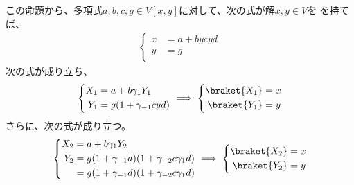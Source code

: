 {	この命題から、多項式$a,b,c,g\in V[x,y]$に対して、次の式が解$x,y\in V$を
	を持てば、
	\begin{equation*}\begin{split}
		\left\{\begin{split}
			x &= a + bycyd \\
			y &= g \\
		\end{split}\right.
	\end{split}\end{equation*}
	次の式が成り立ち、
	\begin{equation*}\begin{split}
		\left\{\begin{split}
			X_1 &= a + b\gamma_1Y_1 \\
			Y_1 &= g(1 + \gamma_{-1}cyd) \\
		\end{split}\right. \implies \left\{\begin{split}
			\braket{X_1} &= x \\
			\braket{Y_1} &= y \\
		\end{split}\right.
	\end{split}\end{equation*}
	さらに、次の式が成り立つ。
	\begin{equation*}\begin{split}
		\left\{\begin{split}
			X_2 &= a + b\gamma_1Y_2 \\
			Y_2 &= g(1 + \gamma_{-1}d)(1 + \gamma_{-2}c\gamma_1d) \\
			&= g(1 + \gamma_{-1}d)(1 + \gamma_{-2}c\gamma_1d) \\
		\end{split}\right. \implies \left\{\begin{split}
			\braket{X_2} &= x \\
			\braket{Y_2} &= y \\
		\end{split}\right.
	\end{split}\end{equation*}

}
